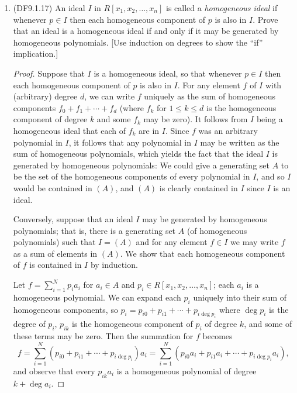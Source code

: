 \documentclass[11pt]{article}
\begin{document}
\begin{enumerate}
\begin{proof}
      It follows that $(x,y)$ and $(2,x,y)$ are prime ideals in $\mathbb{Z}[x,y]$, but only $(2,x,y)$ is a maximal ideal.
    \end{proof}
    \item (DF9.1.17) An ideal $I$ in $R[x_1, x_2, \dots, x_n]$ is called a \textit{homogeneous ideal} if whenever $p\in I$ then each homogeneous component of $p$ is also in $I$. Prove that an ideal is a homogeneous ideal if and only if it may be generated by homogeneous polynomials. [Use induction on degrees to show the ``if'' implication.]
    \begin{proof}
      Suppose that $I$ is a homogeneous ideal, so that whenever $p\in I$ then each homogeneous component of $p$ is also in $I$. For any element $f$ of $I$ with (arbitrary) degree $d$, we can write $f$ uniquely as the sum of homogeneous components $f_0 + f_1 + \cdots + f_d$ (where $f_k$ for $1\leq k \leq d$ is the homogeneous component of degree $k$ and some $f_k$ may be zero). It follows from $I$ being a homogeneous ideal that each of $f_k$ are in $I$. Since $f$ was an arbitrary polynomial in $I$, it follows that any polynomial in $I$ may be written as the sum of homogeneous polynomials, which yields the fact that the ideal $I$ is generated by homogeneous polynomials: We could give a generating set $A$ to be the set of the homogeneous components of every polynomial in $I$, and so $I$ would be contained in $(A)$, and $(A)$ is clearly contained in $I$ since $I$ is an ideal.

      Conversely, suppose that an ideal $I$ may be generated by homogeneous polynomials; that is, there is a generating set $A$ (of homogeneous polynomials) such that $I= (A)$ and for any element $f\in I$ we may write $f$ as a sum of elements in $(A)$. We show that each homogeneous component of $f$ is contained in $I$ by induction. 

      Let $f = \sum_{i=1}^N p_ia_i$ for $a_i\in A$ and $p_i\in R[x_1, x_2, \dots, x_n]$; each $a_i$ is a homogeneous polynomial. We can expand each $p_i$ uniquely into their sum of homogeneous components, so $p_i = p_{i0} + p_{i1} + \cdots + p_{i\deg p_i}$ where $\deg p_i$ is the degree of $p_i$, $p_{ik}$ is the homogeneous component of $p_i$ of degree $k$, and some of these terms may be zero. Then the summation for $f$ becomes \[f = \sum_{i=1}^N (p_{i0} + p_{i1} + \cdots + p_{i\deg p_i})a_i = \sum_{i=1}^N (p_{i0}a_i + p_{i1}a_i + \cdots + p_{i\deg p_i}a_i),\] and observe that every $p_{ik}a_i$ is a homogeneous polynomial of degree $k+ \deg a_i$. 


\end{proof}
\end{enumerate}
\end{document}
